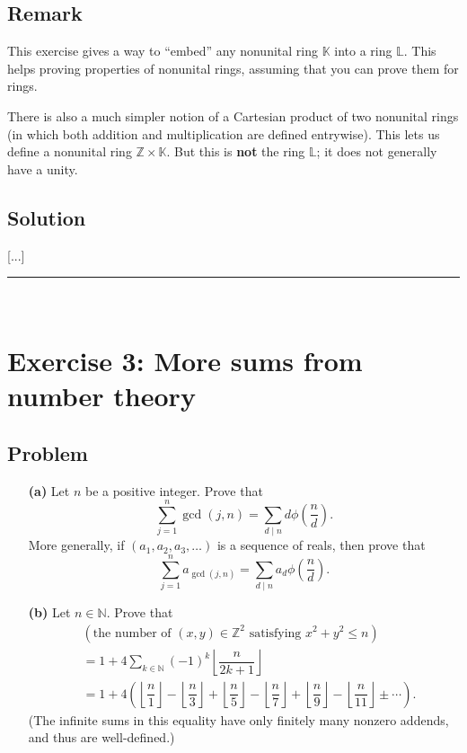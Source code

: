 \documentclass[paper=a4, fontsize=12pt]{scrartcl} %
\newcommand{\NN}{\mathbb{N}} %
\newcommand{\KK}{\mathbb{K}} %
\newcommand{\LL}{\mathbb{L}} %
\newcommand{\ZZ}{\mathbb{Z}} %
\newcommand{\tup}[1]{\left( #1 \right)}
\newcommand{\floor}[1]{\left\lfloor #1 \right\rfloor}
\newcommand{\horrule}[1]{\rule{\linewidth}{#1}} %
\let\sumnonlimits\sum
\renewcommand{\sum}{\sumnonlimits\limits}
\theoremstyle{plainsl}
\theoremstyle{definition}
\theoremstyle{remark}
\begin{document}
\subsection{Remark}

This exercise gives a way to ``embed'' any nonunital ring $\KK$
into a ring $\LL$.
This helps proving properties of nonunital rings, assuming that
you can prove them for rings.

There is also a much simpler notion of a Cartesian product of two nonunital
rings (in which both addition and multiplication are defined entrywise). This
lets us define a nonunital ring $\ZZ \times \KK$. But this is
\textbf{not} the ring $\LL$; it does not generally have a unity.

\subsection{Solution}

[...]

\horrule{0.3pt} \\[0.4cm]

\section{Exercise 3: More sums from number theory}

\subsection{Problem}

\begin{enumerate}

\item[\textbf{(a)}]
Let $n$ be a positive integer.
Prove that
\[
\sum_{j=1}^{n} \gcd \tup{j, n}
= \sum_{d \mid n} d \phi\tup{ \dfrac{n}{d} }.
\]
More generally, if $\tup{a_1, a_2, a_3, \ldots}$ is a sequence
of reals, then prove that
\[
\sum_{j=1}^{n} a_{\gcd \tup{j, n}}
= \sum_{d \mid n} a_d \phi\tup{ \dfrac{n}{d} }.
\]

\item[\textbf{(b)}]
Let $n \in \NN$. Prove that
\begin{align*}
& \tup{ \text{the number of $\tup{x, y} \in \ZZ^2$ satisfying
              $x^2 + y^2 \leq n$} } \\
& = 1 + 4\sum_{k \in \NN} \tup{-1}^k \floor{ \dfrac{n}{2k+1} } \\
& = 1 + 4 \tup{   \floor{\dfrac{n}{1}} - \floor{\dfrac{n}{3}} 
                + \floor{\dfrac{n}{5}} - \floor{\dfrac{n}{7}}
                + \floor{\dfrac{n}{9}} - \floor{\dfrac{n}{11}}
                \pm \cdots } .
\end{align*}
(The infinite sums in this equality have only finitely many nonzero addends,
and thus are well-defined.)

\end{enumerate}
\end{document}
